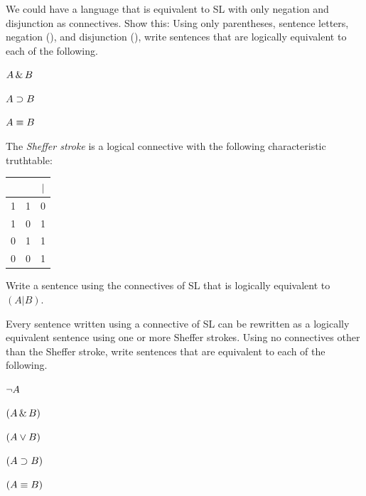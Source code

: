 We could have a language that is equivalent to SL with only negation and disjunction as connectives. Show this: Using only parentheses, sentence letters, negation (\enot), and disjunction (\eor), write sentences that are logically equivalent to each of the following.
\begin{earg}
\item $A \,\&\, B$
\item $A \supset B$
\item $A \equiv B$
\end{earg}
\label{pr.sheffer}
The \emph{Sheffer stroke} is a logical connective with the following characteristic truthtable:
\begin{center}
\begin{tabular}{c|c|c}
\metaA{} & \metaB{} & \metaA{}$|$\metaB{}\\
\hline
1 & 1 & 0\\
1 & 0 & 1\\
0 & 1 & 1\\
0 & 0 & 1
\end{tabular}
\end{center}
\begin{earg}
\item Write a sentence using the connectives of SL that is logically equivalent to $(A|B)$.
\end{earg}
Every sentence written using a connective of SL can be rewritten as a logically equivalent sentence using one or more Sheffer strokes. Using no connectives other than the Sheffer stroke, write sentences that are equivalent to each of the following. 
\begin{earg}
\item $\neg A$
\item $(A\,\&\, B)$
\item $(A\vee B)$
\item $(A\supset B)$
\item $(A\equiv B)$
\end{earg}


\problempart
\label{HW2.F}


